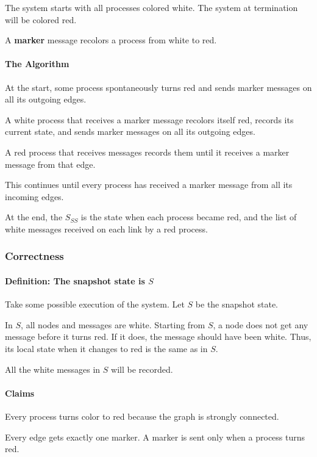 \documentclass{idc_msc}
\begin{document}
The system starts with all processes colored white.
The system at termination will be colored red.

A \textbf{marker} message recolors a process from white to red.

\paragraph{The Algorithm}

At the start, some process spontaneously turns red and sends marker messages on all its outgoing edges.

A white process that receives a marker message recolors itself red, records its current state, and sends marker messages on all its outgoing edges.

A red process that receives messages records them until it receives a marker message from that edge.

This continues until every process has received a marker message from all its incoming edges.

At the end, the $S_{SS}$ is the state when each process became red, and the list of white messages received on each link by a red process.

\subsubsection{Correctness}

\paragraph{Definition: The snapshot state is $S$}

Take some possible execution of the system. Let $S$ be the snapshot state.

In $S$, all nodes and messages are white.
Starting from $S$, a node does not get any message before it turns red.
If it does, the message should have been white.
Thus, its local state when it changes to red is the same as in $S$.

All the white messages in $S$ will be recorded.

\paragraph{Claims}

Every process turns color to red because the graph is strongly connected.

Every edge gets exactly one marker. A marker is sent only when a process turns red.
\end{document}
